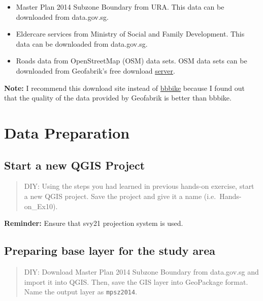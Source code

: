 \documentclass[
  letterpaper,
  DIV=11,
  numbers=noendperiod]{scrreprt}
\providecommand{\tightlist}{%
  \setlength{\itemsep}{0pt}\setlength{\parskip}{0pt}}\usepackage{longtable,booktabs,array}
\begin{document}
\begin{itemize}
\tightlist
\item
  Master Plan 2014 Subzone Boundary from URA. This data can be
  downloaded from data.gov.sg.
\item
  Eldercare services from Ministry of Social and Family Development.
  This data can be downloaded from data.gov.sg.
\item
  Roads data from OpenStreetMap (OSM) data sets. OSM data sets can be
  downloaded from Geofabrik's free download
  \href{https://download.geofabrik.de/}{server}.
\end{itemize}

\textbf{Note:} I recommend this download site instead of
\href{https://www.bbbike.org/}{bbbike} because I found out that the
quality of the data provided by Geofabrik is better than bbbike.

\hypertarget{data-preparation-6}{%
\section{Data Preparation}\label{data-preparation-6}}

\hypertarget{start-a-new-qgis-project-2}{%
\subsection{Start a new QGIS Project}\label{start-a-new-qgis-project-2}}

\begin{quote}
DIY: Using the steps you had learned in previous hands-on exercise,
start a new QGIS project. Save the project and give it a name
(i.e.~Hands-on\_Ex10).
\end{quote}

\textbf{Reminder:} Ensure that svy21 projection system is used.

\hypertarget{preparing-base-layer-for-the-study-area-1}{%
\subsection{Preparing base layer for the study
area}\label{preparing-base-layer-for-the-study-area-1}}

\begin{quote}
DIY: Download Master Plan 2014 Subzone Boundary from data.gov.sg and
import it into QGIS. Then, save the GIS layer into GeoPackage format.
Name the output layer as \texttt{mpsz2014}.
\end{quote}
\end{document}
